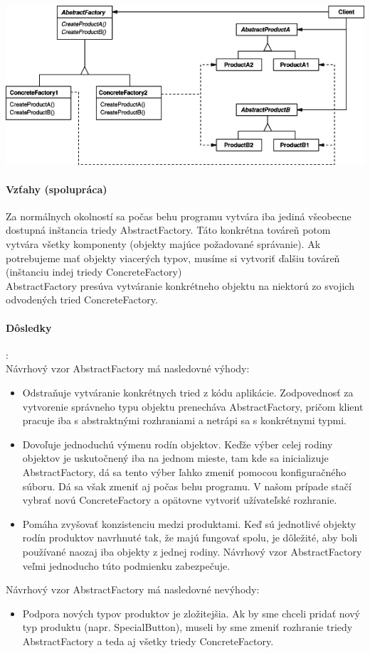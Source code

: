 		\includegraphics[width=.9\textwidth]{images/abstractfactory2}

		\paragraph{Vzťahy (spolupráca)}
		Za normálnych okolností sa počas behu programu vytvára iba jediná všeobecne dostupná inštancia triedy AbstractFactory. Táto konkrétna továreň potom vytvára všetky komponenty (objekty majúce požadované správanie). Ak potrebujeme mať objekty viacerých typov, musíme si vytvoriť ďalšiu továreň (inštanciu indej triedy ConcreteFactory)\\
		AbstractFactory presúva vytváranie konkrétneho objektu na niektorú zo svojich odvodených tried ConcreteFactory.


		\paragraph{Dôsledky}:\\
		Návrhový vzor AbstractFactory má nasledovné výhody:
			\begin{itemize}
				\item Odstraňuje vytváranie konkrétnych tried z kódu aplikácie. Zodpovednosť za vytvorenie správneho typu objektu prenecháva AbstractFactory, pričom klient pracuje iba s abstraktnými rozhraniami a netrápi sa s konkrétnymi typmi.
				\item Dovoľuje jednoduchú výmenu rodín objektov. Keďže výber celej rodiny objektov je uskutočnený iba na jednom mieste, tam kde sa inicializuje AbstractFactory, dá sa tento výber ľahko zmeniť pomocou konfiguračného súboru. Dá sa však zmeniť aj počas behu programu. V našom prípade stačí vybrať novú ConcreteFactory a opätovne vytvoriť užívateľské rozhranie.
				\item Pomáha zvyšovať konzistenciu medzi produktami. Keď sú jednotlivé objekty rodín produktov navrhnuté tak, že majú fungovať spolu, je dôležité, aby boli používané naozaj iba objekty z jednej rodiny. Návrhový vzor AbstractFactory veľmi jednoducho túto podmienku zabezpečuje.
			\end{itemize}
		Návrhový vzor AbstractFactory má nasledovné nevýhody:
			\begin{itemize}
				\item Podpora nových typov produktov je zložitejšia. Ak by sme chceli pridať nový typ produktu (napr. SpecialButton), museli by sme zmeniť rozhranie triedy AbstractFactory a teda aj všetky triedy ConcreteFactory.
			\end{itemize}
